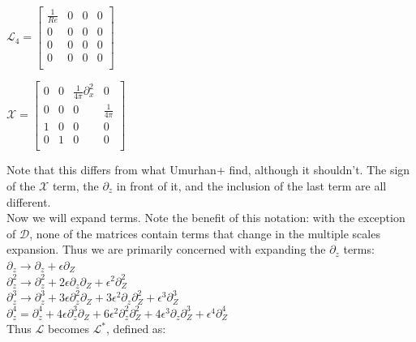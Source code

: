 \documentclass[letterpaper,12pt]{article}
\newcommand\reye{\mathrel{Re}}
\begin{document}
$\mathcal{L}_4 = \left[\begin{matrix}
\frac{1}{\reye} & 0 & 0 & 0 \\
0 & 0 & 0 & 0 \\
0 & 0 & 0 & 0 \\
0 & 0 & 0 & 0 \\ \end{matrix}\right] $ \\

\vspace{2mm}

$\mathcal{X} = \left[\begin{matrix}
0 & 0 & \frac{1}{4\pi}\partial_x^2 & 0 \\
0 & 0 & 0 & \frac{1}{4\pi} \\
1 & 0 & 0 & 0 \\
0 & 1 & 0 & 0 \\ \end{matrix} \right]$ \\

\vspace{2mm}

Note that this differs from what Umurhan+ find, although it shouldn't. The sign of the $\mathcal{X}$ term, the $\partial_z$ in front of it, and the inclusion of the last term are all different. \\

Now we will expand terms. Note the benefit of this notation: with the exception of $\mathcal{D}$, none of the matrices contain terms that change in the multiple scales expansion. Thus we are primarily concerned with expanding the $\partial_z$ terms: \\

$\partial_z \to \partial_z + \epsilon \partial_Z$ \\

$\partial_z^2 \to \partial_z^2 + 2\epsilon \partial_z \partial_Z + \epsilon^2 \partial_Z^2$ \\

$\partial_z^3 \to \partial_z^3 + 3 \epsilon \partial_z^2 \partial_Z + 3 \epsilon^2 \partial_z \partial_Z^2 + \epsilon^3 \partial_Z^3$ \\

$\partial_z^4 = \partial_z^4 + 4\epsilon \partial_z^3 \partial_Z + 6 \epsilon^2 \partial_z^2 \partial_Z^2 + 4 \epsilon^3 \partial_z \partial_Z^3 + \epsilon^4\partial_Z^4$ \\

Thus $\mathcal{L}$ becomes $\mathcal{L^*}$, defined as: \\
\end{document}
